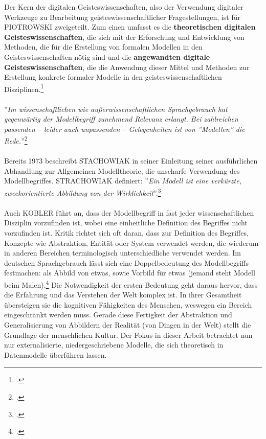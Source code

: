 \documentclass[12pt,a4paper]{article}
\begin{document}
Der  Kern der digitalen Geisteswissenschaften, also der Verwendung digitaler Werkzeuge zu Bearbeitung geisteswissenschaftlicher Fragestellungen, ist für PIOTROWSKI zweigeteilt. Zum einen umfasst es die \textbf{theoretischen digitalen Geisteswissenschaften}, die sich mit der Erforschung und Entwicklung von Methoden, die für die Erstellung von formalen Modellen in den Geisteswissenschaften nötig sind und die \textbf{angewandten digitale Geisteswissenschaften}, die die Anwendung dieser Mittel und Methoden zur Erstellung konkrete formaler Modelle in den geisteswissenschaftlichen Disziplinen.\footcite{piotrowski2016digital}
\\
\\
''\textit{Im wissenschaftlichen wie außerwissenschaftlichen Sprachgebrauch hat gegenwärtig der Modellbegriff zunehmend Relevanz erlangt. Bei zahlreichen passenden -- leider auch unpassenden -- Gelegenheiten ist von ''Modellen'' die Rede.}''\footcite[][S.1]{stachowiak1973allgemeine}
\\
\\
Bereits 1973 beschreibt STACHOWIAK in seiner Einleitung seiner ausführlichen Abhandlung zur Allgemeinen Modelltheorie, die unscharfe Verwendung des Modellbegriffes. STRACHOWIAK definiert: ''\textit{Ein Modell ist eine verkürzte, zweckorientierte Abbildung von der Wirklichkeit}''.\footcite[][]{stachowiak1973allgemeine}
\\
\\
Auch KOBLER führt an, dass der Modellbegriff in fast jeder wissenschaftlichen Disziplin vorzufinden ist, wobei eine einheitliche Definition des Begriffes nicht vorzufinden ist. Kritik richtet sich oft daran, dass zur Definition des Begriffes, Konzepte wie Abstraktion, Entität oder System verwendet werden, die wiederum in anderen Bereichen terminologisch unterschiedliche verwendet werden.
Im deutschen Sprachgebrauch lässt sich eine Doppelbedeutung des Modellbegriffs festmachen: als Abbild von etwas, sowie Vorbild für etwas (jemand steht Modell beim Malen).\footcite[][S.129]{stachowiak1973allgemeine} Die Notwendigkeit der ersten Bedeutung geht daraus hervor, dass die Erfahrung und das Verstehen der Welt komplex ist. In ihrer Gesamtheit übersteigen sie die kognitiven Fähigkeiten des Menschen, weswegen ein Bereich eingeschränkt werden muss. Gerade diese Fertigkeit der Abstraktion und Generalisierung von Abbildern der Realität (von Dingen in der Welt) stellt die Grundlage der menschlichen Kultur. Der Fokus in dieser Arbeit betrachtet nun nur externalisierte, niedergeschriebene Modelle, die sich theoretisch in Datenmodelle überführen lassen. 
\end{document}

